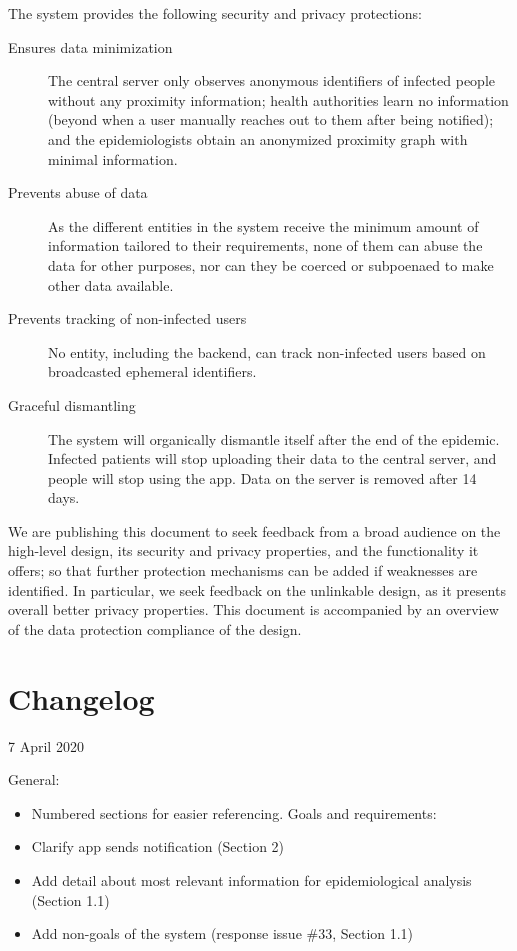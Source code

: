 \documentclass[10.8pt,a4paper]{article}
\begin{document}
The system provides the following security and privacy protections:

\begin{description}
\item[Ensures data minimization] The central server only observes anonymous identifiers of infected people without any proximity information; health authorities learn no information (beyond when a user manually reaches out to them after being notified);
and the epidemiologists obtain an anonymized proximity graph with minimal information.
\item[Prevents abuse of data] As the different entities in the system receive the minimum amount of information tailored to their requirements, none of them can abuse the data for other purposes, nor can they be coerced or subpoenaed to make other data available.
\item[Prevents tracking of non-infected users] No entity, including the backend, can track non-infected users based on broadcasted ephemeral identifiers.
\item[Graceful dismantling] The system will organically dismantle itself after the end of the epidemic. Infected patients will stop uploading their data to the central server, and people will stop using the app. Data on the server is removed after 14 days.
\end{description}

We are publishing this document to seek feedback from a broad audience on the high-level design, its security and privacy properties, and the functionality it offers; so that further protection mechanisms can be added if weaknesses are identified. In particular, we seek feedback on the unlinkable design, as it presents overall better privacy properties. This document is accompanied by an overview of the data protection compliance of the design.

\clearpage
\section*{Changelog}


7 April 2020

General:

\begin{itemize}
\item Numbered sections for easier referencing.
Goals and requirements:
\item Clarify app sends notification (Section 2)
\item Add detail about most relevant information for epidemiological analysis (Section
1.1)
\item Add non-goals of the system (response issue \#33, Section 1.1)
\end{itemize}
\end{document}
